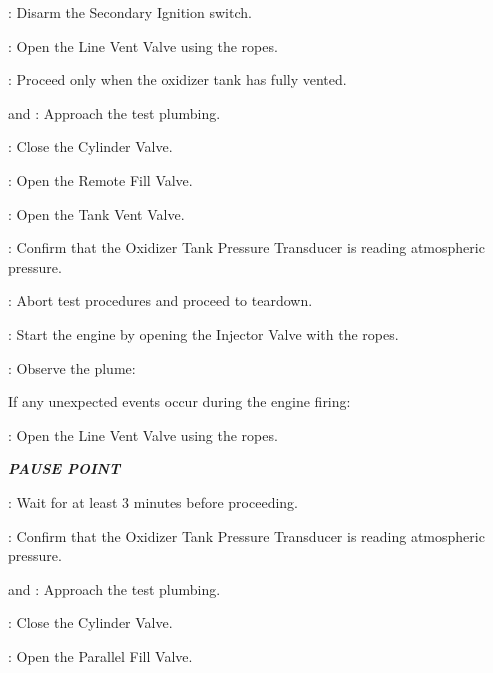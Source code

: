 \begin{checklist}
\begin{checklist}
\begin{checklist}[label=$\bullet$]
            \begin{checklist}
                \item \primary: Disarm the Secondary Ignition switch.
                \item \primary: Open the Line Vent Valve using the ropes.
                \item \ops: Proceed only when the oxidizer tank has fully vented.
                \item \primary{} and \secondary: Approach the test plumbing.
                \item \primary{}: Close the Cylinder Valve.
                \item \primary{}: Open the Remote Fill Valve.
                \item \primary{}: Open the Tank Vent Valve.
                \item \daq{}: Confirm that the Oxidizer Tank Pressure Transducer is reading atmospheric pressure.
                \item \ops: Abort test procedures and proceed to teardown.
            \end{checklist}
        \end{checklist}
        \item \primary: Start the engine by opening the Injector Valve with the ropes.
    \end{checklist}
    \item \primary: Observe the plume:
    \begin{checklist}[label=$\bullet$]
        \item If any unexpected events occur during the engine firing:
        \begin{checklist}
            \item \primary{}: Open the Line Vent Valve using the ropes.
        \end{checklist}
    \end{checklist}
    \item \textbf{\textit{PAUSE POINT}}
    \item \ops{}: Wait for at least 3 minutes before proceeding.
    \item \daq{}: Confirm that the Oxidizer Tank Pressure Transducer is reading atmospheric pressure.
    \item \primary{} and \secondary: Approach the test plumbing.
    \item \primary{}: Close the Cylinder Valve.
    \item \primary{}: Open the Parallel Fill Valve.

\end{checklist}
